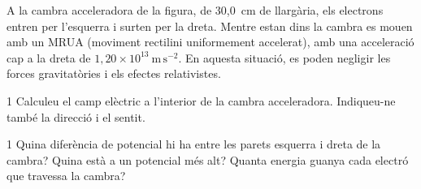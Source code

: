 A la cambra acceleradora de la figura, de 30,0~cm de llargària, els electrons entren per l'esquerra i surten per la dreta. Mentre estan dins la cambra es mouen amb un MRUA (moviment rectilini uniformement accelerat), amb una acceleració cap a la dreta de $1,20\times 10^{13}\ \mathrm{m\,s^{-2}}$. En aquesta situació, es poden negligir les forces gravitatòries i els efectes relativistes.


\begin{apartat}{1}
Calculeu el camp elèctric a l'interior de la cambra acceleradora. Indiqueu-ne també la direcció i el sentit.
\end{apartat}

\begin{apartat}{1}
Quina diferència de potencial hi ha entre les parets esquerra i dreta de la cambra? Quina està a un potencial més alt? Quanta energia guanya cada electró que travessa la cambra?
\end{apartat}

